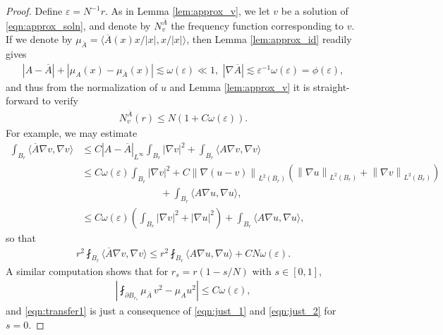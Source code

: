 \documentclass[12pt,leqno]{amsart}
\numberwithin{equation}{section}
\theoremstyle{definition}
\renewcommand{\epsilon}{\varepsilon}
\newcommand{\norm}[1]{\left \lVert #1 \right \rVert}
\newcommand{\abs}[1]{\left \lvert #1 \right \rvert}
\newcommand{\ol}{\overline}
\begin{document}
\begin{proof}
		Define $\epsilon = N^{-1}r$. As in Lemma \ref{lem:approx_v}, we let $v$ be a solution of \eqref{eqn:approx_soln}, and denote by $N_v^{\ol{A}}$ the frequency function corresponding to $v$. If we denote by $\mu_{\ol{A}} = \langle \ol{A}(x) x/\abs{x}, x/\abs{x} \rangle$, then Lemma \ref{lem:approx_id} readily gives
		\begin{align}\label{eqn:ola_approx}
			\abs{A - \ol{A}} + \abs{\mu_A(x) - \mu_{\ol{A}}(x)} \lesssim \omega(\epsilon) \ll 1, \, \, \abs{\nabla \ol{A}} \lesssim \epsilon^{-1} \omega(\epsilon) = \phi(\epsilon),
		\end{align}
		and thus from the normalization of $u$ and Lemma \ref{lem:approx_v} it is straight-forward to verify
		\begin{align}\label{eqn:transfer1}
			N_v^{\ol{A}}(r) \le N( 1 + C \omega(\epsilon)).
		\end{align}
		For example, we may estimate
		\begin{align*}
			 \int_{B_r} \langle \ol{A} \nabla v, \nabla v\rangle  & \le C \abs{A- \ol{A}}_{L^\infty} \int_{B_r} \abs{\nabla v}^2  + \int_{B_r} \langle A \nabla v, \nabla v \rangle \\
			 & \le C   \omega(\epsilon) \int_{B_r} \abs{\nabla v}^2 + C \norm{\nabla(u-v)}_{L^2(B_r)} \left( \norm{\nabla u}_{L^2 (B_r)} + \norm{\nabla v}_{L^2 (B_r)} \right)  \\
			  & \qquad \qquad \qquad \qquad  + \int_{B_r} \langle A \nabla u , \nabla u \rangle, \\
			  & \le C \omega(\epsilon) \left( \int_{B_r} \abs{\nabla v}^2 +\abs{\nabla u}^2 \right) + \int_{B_r} \langle A \nabla u , \nabla u \rangle,
		\end{align*}
		so that 
		\begin{align}\label{eqn:just_1}
			r^2 \fint_{B_r} \langle \ol{A} \nabla v, \nabla v \rangle \le r^{2} \fint_{B_r} \langle A \nabla u, \nabla u \rangle + C N \omega(\epsilon).
		\end{align}
		A similar computation shows that for $r_s = r(1-s/N)$ with $s \in [0,1]$,
		\begin{align}\label{eqn:just_2}
			\abs{ \fint_{\partial B_{r_s}} \mu_{\ol{A }} \, v^2 - \mu_{A} u^2 } \le C \omega(\epsilon), 
		\end{align}
		and \eqref{eqn:transfer1} is just a consequence of \eqref{eqn:just_1} and \eqref{eqn:just_2} for $s = 0$. 
		

\end{proof}
\end{document}

